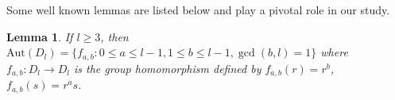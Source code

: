 \documentclass{amsart}
\newtheorem{lemma}[theorem]{Lemma}
\theoremstyle{definition}
\theoremstyle{remark}
\newcommand{\Aut}{Aut}
\numberwithin{equation}{section}
\begin{document}
    Some well known lemmas are listed below and play a pivotal role in our study.
    \begin{lemma}\label{automorphism_characterization_of_D_l}
        If $l \geq 3$, then $\mathrm{Aut}(D_{l}) = \{f_{a,b} : 0 \leq a \leq l - 1, 1 \leq b \leq l - 1, \gcd(b, l) = 1\}$ where $f_{a,b}: D_{l} \to D_{l}$ is the group homomorphism defined by $f_{a, b}(r) = r^b$, $f_{a,b}(s) = r^as$.
    \end{lemma}
        
\end{document}
